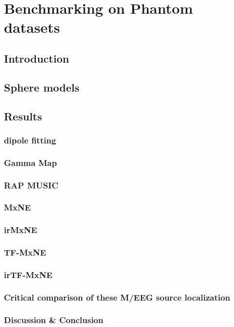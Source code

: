 
\chapter{Benchmarking on Phantom datasets}
\label{chapter:benchmark}
\noindent\makebox[\linewidth]{\rule{0.75\paperwidth}{0.4pt}}
\noindent\makebox[\linewidth]{\rule{0.75\paperwidth}{0.4pt}}

\localtableofcontents %

\noindent\makebox[\linewidth]{\rule{0.75\paperwidth}{0.4pt}}
\noindent\makebox[\linewidth]{\rule{0.75\paperwidth}{0.4pt}}
\newpage

\section{Introduction}
\section{Sphere models}
\section{Results}
\subsection{dipole fitting}
\subsection{Gamma Map}
\subsection{RAP MUSIC}
\subsection{MxNE}
\subsection{irMxNE}
\subsection{TF-MxNE}
\subsection{irTF-MxNE}
\subsection{Critical comparison of these M/EEG source localization}
\subsection{Discussion \& Conclusion}